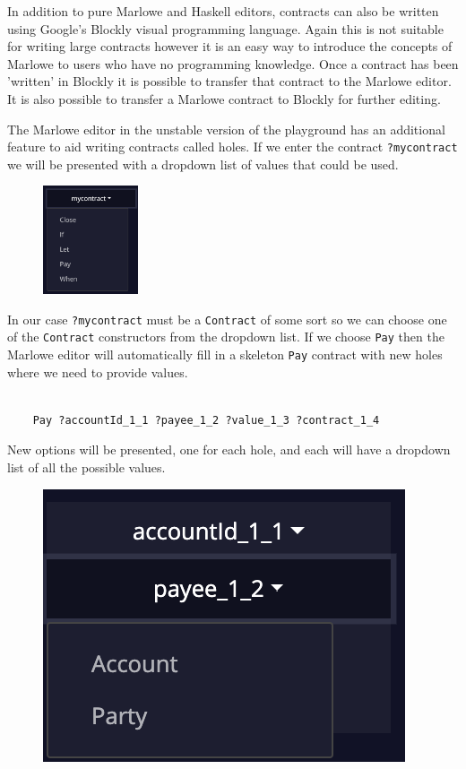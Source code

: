 \documentclass[runningheads]{llncs}
\begin{document}
In addition to pure Marlowe and Haskell editors, contracts can also be written using Google's Blockly visual programming language. Again this is not suitable for writing large contracts however it is an easy way to introduce the concepts of Marlowe to users who have no programming knowledge. Once a contract has been 'written' in Blockly it is possible to transfer that contract to the Marlowe editor. It is also possible to transfer a Marlowe contract to Blockly for further editing.

The Marlowe editor in the unstable version of the playground has an additional feature to aid writing contracts called holes. If we enter the contract \lstinline{?mycontract} we will be presented with a dropdown list of values that could be used.

\begin{figure}
    \vspace*{-0.3in}
    \includegraphics[width=0.25\textwidth]{hole_options.png}
\end{figure}
In our case \lstinline{?mycontract} must be a \lstinline{Contract} of some sort so we can choose one of the \lstinline{Contract} constructors from the dropdown list. If we choose \lstinline{Pay} then the Marlowe editor will automatically fill in a skeleton \lstinline{Pay} contract with new holes where we need to provide values.
\\ \\
\begin{verbatim}
    Pay ?accountId_1_1 ?payee_1_2 ?value_1_3 ?contract_1_4
\end{verbatim}
New options will be presented, one for each hole, and each will have a dropdown list of all the possible values.
\begin{figure}
    \vspace*{-0.3in}
    \includegraphics[scale=0.2]{hole_options_2.png}
\end{figure}
\end{document}
